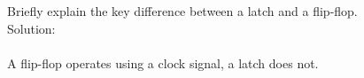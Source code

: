 Briefly explain the key difference between a latch and a flip-flop. \\

Solution: \\ \\
A flip-flop operates using a clock signal, a latch does not. \\

